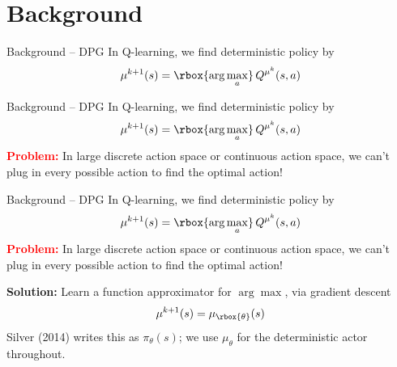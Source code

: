 \section{Background}
\begin{frame}{Background -- DPG}
In Q-learning, we find deterministic policy by
\[
\mu^{k+1}(s) = \rbox{\arg\max_{a}}\, Q^{\mu^{k}}(s, a)
\]
\end{frame}

\begin{frame}{Background -- DPG}
In Q-learning, we find deterministic policy by
\[
\mu^{k+1}(s) = \rbox{\arg\max_{a}}\, Q^{\mu^{k}}(s, a)
\]
\textcolor{red}{\textbf{Problem:}} In large discrete action space or continuous action space, we can't plug in every possible action to find the optimal action!
\end{frame}

\begin{frame}{Background -- DPG}
In Q-learning, we find deterministic policy by
\[
\mu^{k+1}(s) = \rbox{\arg\max_{a}}\, Q^{\mu^{k}}(s, a)
\]
\textcolor{red}{\textbf{Problem:}} In large discrete action space or continuous action space, we can't plug in every possible action to find the optimal action!

\textcolor{green!50!black}{\textbf{Solution:}} Learn a function approximator for $\arg\max$, via gradient descent
\[
\mu^{k+1}(s) = \mu_{\rbox{\theta}}(s)
\]
\vspace{-0.3em}
{\tiny Silver (2014) writes this as $\pi_\theta(s)$; we use $\mu_\theta$ for the deterministic actor throughout.}
\end{frame}

